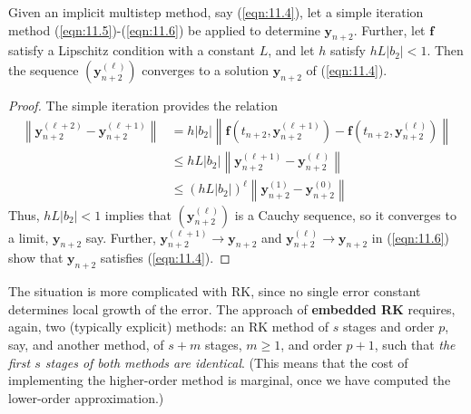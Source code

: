 \documentclass[a4paper]{article}
\begin{document}
\begin{lemma}
    Given an implicit multistep method, say (\ref{eqn:11.4}), let a simple iteration method (\ref{eqn:11.5})-(\ref{eqn:11.6}) be applied to determine $\mathbf{y}_{n+2}$. Further, let $\mathbf{f}$ satisfy a Lipschitz condition with a constant $L$, and let $h$ satisfy $h L\left|b_2\right|<1$. Then the sequence $(\mathbf{y}_{n+2}^{(\ell)})$ converges to a solution $\mathbf{y}_{n+2}$ of (\ref{eqn:11.4}).
\end{lemma}
\begin{proof}
    The simple iteration provides the relation
\[
\begin{aligned}
\left\|\mathbf{y}_{n+2}^{(\ell+2)}-\mathbf{y}_{n+2}^{(\ell+1)}\right\| & =h\left|b_2\right|\left\|\mathbf{f}\left(t_{n+2}, \mathbf{y}_{n+2}^{(\ell+1)}\right)-\mathbf{f}\left(t_{n+2}, \mathbf{y}_{n+2}^{(\ell)}\right)\right\| \\ 
&\leq h L\left|b_2\right|\left\|\mathbf{y}_{n+2}^{(\ell+1)}-\mathbf{y}_{n+2}^{(\ell)}\right\| \\
& \leq\left(h L\left|b_2\right|\right)^{\ell}\left\|\mathbf{y}_{n+2}^{(1)}-\mathbf{y}_{n+2}^{(0)}\right\|
\end{aligned}
\]
Thus, $h L\left|b_2\right|<1$ implies that $(\mathbf{y}_{n+2}^{(\ell)})$ is a Cauchy sequence, so it converges to a limit, $\mathbf{y}_{n+2}$ say. Further, $\mathbf{y}_{n+2}^{(\ell+1)} \rightarrow \mathbf{y}_{n+2}$ and $\mathbf{y}_{n+2}^{(\ell)} \rightarrow \mathbf{y}_{n+2}$ in (\ref{eqn:11.6}) show that $\mathbf{y}_{n+2}$ satisfies (\ref{eqn:11.4}).
\end{proof}

\begin{technique}
    The situation is more complicated with RK, since no single error constant determines local growth of the error. The approach of \textbf{embedded RK} requires, again, two (typically explicit) methods: an RK method of $s$ stages and order $p$, say, and another method, of $s+m$ stages, $m \geq 1$, and order $p+1$, such that \textit{the first $s$ stages of both methods are identical}. (This means that the cost of implementing the higher-order method is marginal, once we have computed the lower-order approximation.) 
\end{technique}
\end{document}
